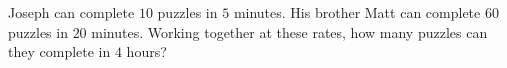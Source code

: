 Joseph can complete $10$ puzzles in $5$ minutes. His brother Matt can complete $60$ puzzles in $20$ minutes. Working together at these rates, how many puzzles can they complete in $4$ hours?
